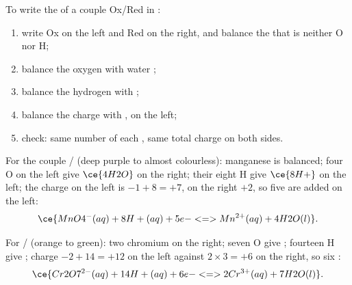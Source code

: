 \begin{method}\label{met:g11:redox:balance}
To write the  of a couple Ox/Red in :
\begin{enumerate}
  \item write Ox on the left and Red on the right, and balance the 
        that is neither O nor H;
  \item balance the oxygen  with water  ;
  \item balance the hydrogen  with  ;
  \item balance the charge with  , on the left;
  \item check: same number of each , same total charge on both
        sides.
\end{enumerate}
\end{method}

\begin{example}\label{ex:g11:redox:permanganate}
For the couple / (deep purple to almost
colourless): manganese is balanced; four O on the left give
$\ce{4H2O}$ on the right; their eight H give $\ce{8H+}$ on the left; the
charge on the left is $-1 + 8 = +7$, on the right $+2$, so five
 are added on the left:
\[
  \ce{MnO4^-(aq) + 8H+(aq) + 5e- <=> Mn^{2+}(aq) + 4H2O(l)}.
\]
\end{example}

\begin{example}\label{ex:g11:redox:dichromate}
For / (orange to green): two chromium on the
right; seven O give ; fourteen H give ; charge
$-2 + 14 = +12$ on the left against $2 \times 3 = +6$ on the right, so
six :
\[
  \ce{Cr2O7^{2-}(aq) + 14H+(aq) + 6e- <=> 2Cr^{3+}(aq) + 7H2O(l)}.
\]
\end{example}

